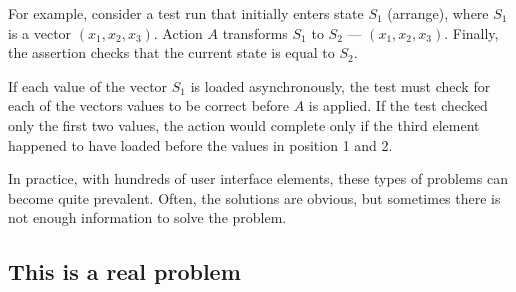 For example, consider a test run that initially enters state $S_{1}$ (arrange), where $S_{1}$ is a vector $(x_{1},x_{2},x_{3})$. Action $A$ transforms $S_1$ to $S_2$ --- $(x_{1},x_{2},x_{3})$. Finally, the assertion checks that the current state is equal to $S_2$.

If each value of the vector $S_{1}$ is loaded asynchronously, the test must check for each of the vectors values to be correct before $A$ is applied. If the test checked only the first two values, the action would complete only if the third element happened to have loaded before the values in position 1 and 2.

In practice, with hundreds of user interface elements, these types of problems can become quite prevalent. Often, the solutions are obvious, but sometimes there is not enough information to solve the problem.

\subsection{This is a real problem}

